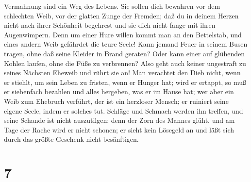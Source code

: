 Vermahnung sind ein Weg des Lebens.  Sie sollen dich
bewahren vor dem schlechten Weib, vor der glatten Zunge der Fremden;
 daß du in deinem Herzen nicht nach ihrer Schönheit
begehrest und sie dich nicht fange mit ihren Augenwimpern.
 Denn um einer Hure willen kommt man an den Bettelstab,
und eines andern Weib gefährdet die teure Seele!  Kann
jemand Feuer in seinem Busen tragen, ohne daß seine Kleider in Brand
geraten?  Oder kann einer auf glühenden Kohlen laufen,
ohne die Füße zu verbrennen?  Also geht auch keiner
ungestraft zu seines Nächsten Eheweib und rührt sie an! 
Man verachtet den Dieb nicht, wenn er stiehlt, um sein Leben zu fristen,
wenn er Hunger hat;  wird er ertappt, so muß er
siebenfach bezahlen und alles hergeben, was er im Hause hat;
 wer aber ein Weib zum Ehebruch verführt, der ist ein
herzloser Mensch; er ruiniert seine eigene Seele, indem er solches tut.
 Schläge und Schmach werden ihn treffen, und seine
Schande ist nicht auszutilgen;  denn der Zorn des Mannes
glüht, und am Tage der Rache wird er nicht schonen;  er
sieht kein Lösegeld an und läßt sich durch das größte Geschenk nicht
besänftigen.

\hypertarget{section-6}{%
\section{7}\label{section-6}}

